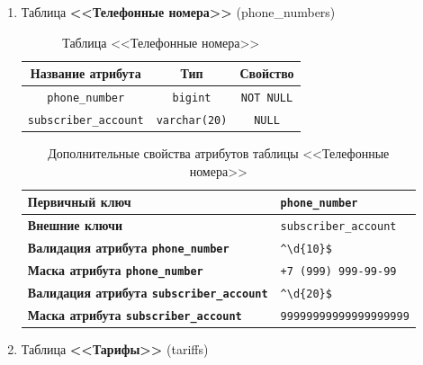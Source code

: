 

\begin{enumerate}
    \item Таблица \textbf{<<Телефонные номера>>} (phone\_numbers)
    
    \renewcommand{\arraystretch}{1.5}
    \begin{xltabular}[h]{\textwidth}{|C|C|C|}
        \caption{Таблица <<Телефонные номера>>} \\
        \hline
        \textbf{Название атрибута}   & \textbf{Тип}         & \textbf{Свойство} \\
        \hline \endhead
        \texttt{phone\_number}       & \texttt{bigint}      & \texttt{NOT NULL} \\ \hline
        \texttt{subscriber\_account} & \texttt{varchar(20)} & \texttt{NULL}     \\ \hline
    \end{xltabular}

    \renewcommand{\arraystretch}{1.5}
    \begin{xltabular}[h]{\textwidth}{|X|X|}
        \caption{Дополнительные свойства атрибутов таблицы <<Телефонные номера>>} \\
        \hline
        \textbf{Первичный ключ}                                  & \texttt{phone\_number}                               \\ \hline
        \textbf{Внешние ключи}                                   & \texttt{subscriber\_account}                         \\ \hline
        \textbf{Валидация атрибута \texttt{phone\_number}}       & \texttt{\textasciicircum{}\textbackslash{}d\{10\}\$} \\ \hline
        \textbf{Маска атрибута \texttt{phone\_number}}           & \texttt{+7 (999) 999-99-99}                          \\ \hline
        \textbf{Валидация атрибута \texttt{subscriber\_account}} & \texttt{\textasciicircum{}\textbackslash{}d\{20\}\$} \\ \hline
        \textbf{Маска атрибута \texttt{subscriber\_account}}     & \texttt{99999999999999999999}                        \\ \hline
    \end{xltabular}


    \item Таблица \textbf{<<Тарифы>>} (tariffs)
    

\end{enumerate}
